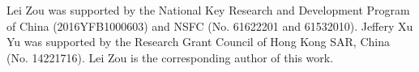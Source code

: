 \documentclass[sigconf]{acmart}
\begin{document}
%
%
%




\maketitle









\vspace{-0.05in}
\begin{acks}
Lei Zou was supported by the National Key Research and Development Program of China (2016YFB1000603)  and NSFC (No. 61622201 and 61532010).
Jeffery Xu Yu was supported by the Research Grant Council of Hong Kong SAR, China (No. 14221716).
Lei Zou is the corresponding author of this work.
\end{acks}
\vspace{-0.05in}

 
\end{document}
